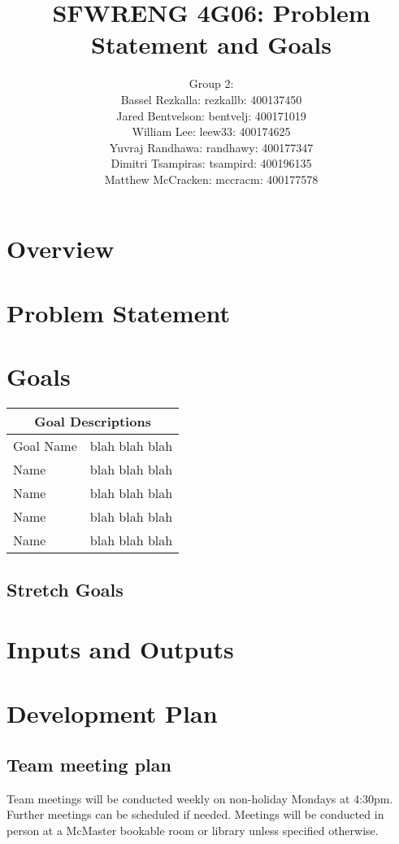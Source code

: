 \documentclass[12pt]{article}
\title{SFWRENG 4G06: Problem Statement and Goals}
\author{Group 2: \\ Bassel Rezkalla: rezkallb: 400137450 \\ Jared Bentvelson: bentvelj: 400171019 \\ William Lee: leew33: 400174625 \\ Yuvraj Randhawa: randhawy: 400177347 \\ Dimitri Tsampiras: tsampird: 400196135 \\ Matthew McCracken: mccracm: 400177578}
\begin{document}
	
	
	
	\maketitle

	
\section {Overview}

\section {Problem Statement}

\section {Goals}
	\begin{tabular}{ |p{6cm}|p{10cm}| }
		\hline
		\multicolumn{2}{|c|}{Goal Descriptions} \\
		\hline
		Goal Name & blah blah blah \\
		\hline
		Name & blah blah blah \\
		\hline
		Name & blah blah blah \\
		\hline
		Name & blah blah blah \\
		\hline
		Name & blah blah blah \\
		\hline
	\end{tabular}

\subsection{Stretch Goals}

\section{Inputs and Outputs}

\section {Development Plan}

\subsection{Team meeting plan}
Team meetings will be conducted weekly on non-holiday Mondays at 4:30pm.
Further meetings can be scheduled if needed.
Meetings will be conducted in person at a McMaster bookable room or library unless specified otherwise.
\end{document}
